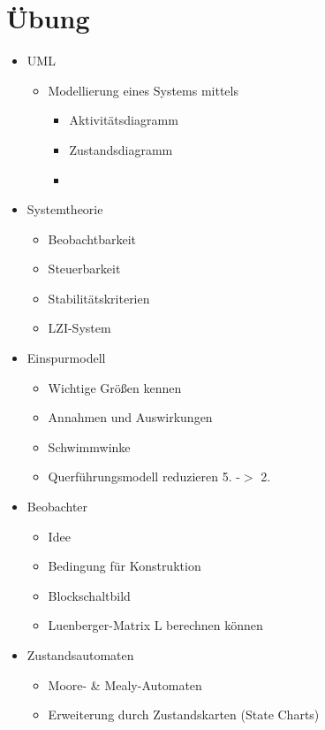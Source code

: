 \section{\"Ubung}
\begin{itemize}
    \item UML\begin{itemize}
              \item Modellierung eines Systems mittels\begin{itemize}
                        \item Aktivit\"atsdiagramm
                        \item Zustandsdiagramm
                        \item
                    \end{itemize}
          \end{itemize}
    \item Systemtheorie\begin{itemize}
              \item Beobachtbarkeit
              \item Steuerbarkeit
              \item Stabilitätskriterien
              \item LZI-System
          \end{itemize}
    \item Einspurmodell\begin{itemize}
              \item Wichtige Größen kennen
              \item Annahmen und Auswirkungen
              \item Schwimmwinke
              \item Querführungsmodell reduzieren 5. -$>$ 2.
          \end{itemize}
    \item Beobachter\begin{itemize}
        \item Idee
        \item Bedingung für Konstruktion
        \item Blockschaltbild
        \item Luenberger-Matrix L berechnen können
    \end{itemize}
    \item Zustandsautomaten\begin{itemize}
        \item Moore- \& Mealy-Automaten
        \item Erweiterung durch Zustandskarten (State Charts)
    \end{itemize}
\end{itemize}